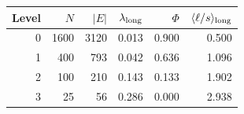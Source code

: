 \begin{tabular}{rrrrrr}
\toprule
Level & $N$ & $|E|$ & $\lambda_{\rm long}$ & $\Phi$ & $\langle\ell/s\rangle_{\rm long}$ \\
\midrule
0 & 1600 & 3120 & 0.013 & 0.900 & 0.500 \\
1 & 400 & 793 & 0.042 & 0.636 & 1.096 \\
2 & 100 & 210 & 0.143 & 0.133 & 1.902 \\
3 & 25 & 56 & 0.286 & 0.000 & 2.938 \\
\bottomrule
\end{tabular}
